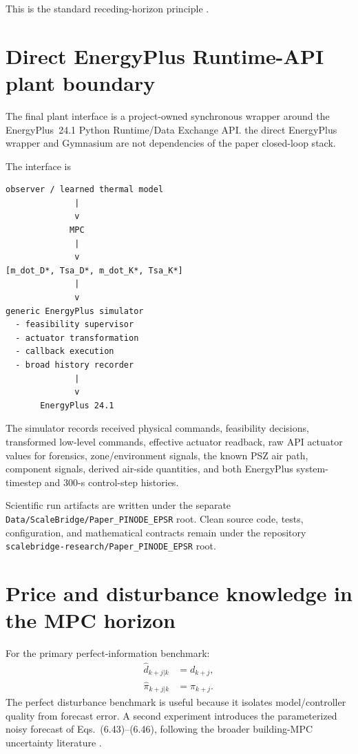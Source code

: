\documentclass[11pt]{article}
\begin{document}
This is the standard receding-horizon principle \citep{garcia1989mpc,rawlings2026mpc}.

\section{Direct EnergyPlus Runtime-API plant boundary}

The final plant interface is a project-owned synchronous wrapper around the
EnergyPlus~24.1 Python Runtime/Data Exchange API.  the direct EnergyPlus wrapper and Gymnasium are
not dependencies of the paper closed-loop stack.

The interface is
\begin{verbatim}
observer / learned thermal model
              |
              v
             MPC
              |
              v
[m_dot_D*, Tsa_D*, m_dot_K*, Tsa_K*]
              |
              v
generic EnergyPlus simulator
  - feasibility supervisor
  - actuator transformation
  - callback execution
  - broad history recorder
              |
              v
       EnergyPlus 24.1
\end{verbatim}

The simulator records received physical commands, feasibility decisions,
transformed low-level commands, effective actuator readback, raw API actuator
values for forensics, zone/environment signals, the known PSZ air path,
component signals, derived air-side quantities, and both EnergyPlus
system-timestep and 300-s control-step histories.

Scientific run artifacts are written under the separate
\texttt{Data/ScaleBridge/Paper\_PINODE\_EPSR} root.  Clean source code, tests,
configuration, and mathematical contracts remain under the repository
\texttt{scalebridge-research/Paper\_PINODE\_EPSR} root.

\section{Price and disturbance knowledge in the MPC horizon}

For the primary perfect-information benchmark:
\begin{align}
\widehat d_{k+j|k}&=d_{k+j},
\\
\widehat \pi_{k+j|k}&=\pi_{k+j}.
\tag{6.78}
\end{align}
The perfect disturbance benchmark is useful because it isolates model/controller quality from
forecast error.  A second experiment introduces the parameterized noisy forecast of
Eqs.~(6.43)--(6.46), following the broader building-MPC uncertainty literature
\citep{oldewurtel2014stochastic,drgona2020all}.
\end{document}
